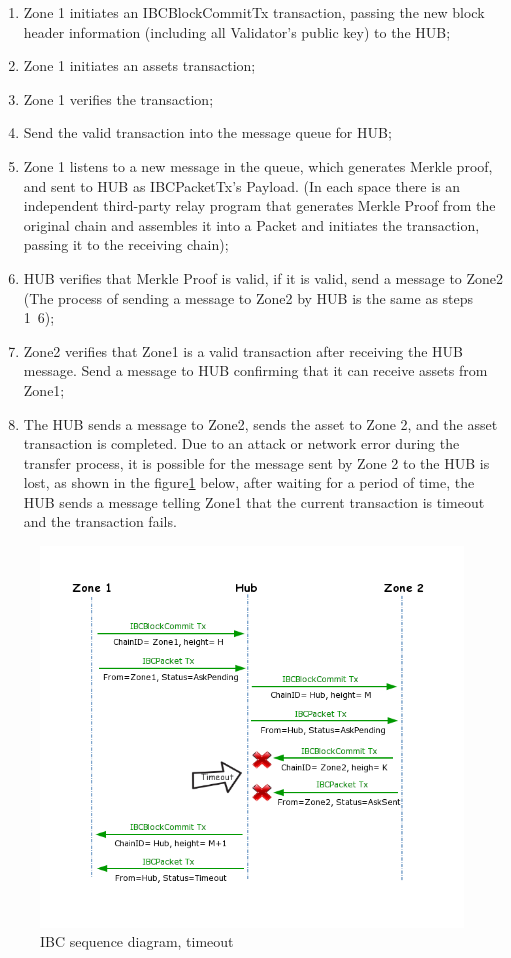 \begin{enumerate}
    \item  Zone 1 initiates an IBCBlockCommitTx transaction, passing the new block header information (including all Validator's public key) to the HUB;
    \item  Zone 1 initiates an assets transaction;
    \item Zone 1 verifies the transaction;
    \item Send the valid transaction into the message queue for HUB;
    \item Zone 1 listens to a new message in the queue, which generates Merkle proof, and sent to HUB as IBCPacketTx's Payload. (In each space there is an independent third-party relay program that generates Merkle Proof from the original chain and assembles it into a Packet and initiates the transaction, passing it to the receiving chain);
    \item HUB verifies that Merkle Proof is valid, if it is valid, send a message to Zone2 (The process of sending a message to Zone2 by HUB is the same as steps 1~6);
    \item Zone2 verifies that Zone1 is a valid transaction after receiving the HUB message. Send a message to HUB confirming that it can receive assets from Zone1;
    \item The HUB sends a message to Zone2, sends the asset to Zone 2, and the asset transaction is completed.
\noindent Due to an attack or network error during the transfer process, it is possible for the message sent by Zone 2 to the HUB is lost, as shown in the figure\ref{fig:timeout} below, after waiting for a period of time, the HUB sends a message telling Zone1 that the current transaction is timeout and the transaction fails.
\end{enumerate}
        \begin{figure}[H]
        \includegraphics[width=1\textwidth]{./figures/IBC_timeout.png}
        \centering
        \caption{IBC sequence diagram, timeout}%
        \centering
        \label{fig:timeout}
        \end{figure}
        
